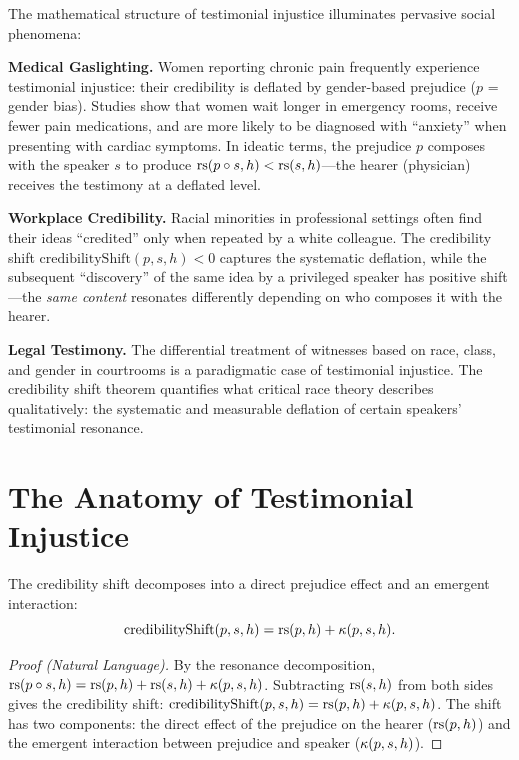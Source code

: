\begin{remark}
The mathematical structure of testimonial injustice illuminates pervasive social
phenomena:

\textbf{Medical Gaslighting.} Women reporting chronic pain frequently experience
testimonial injustice: their credibility is deflated by gender-based prejudice
($p$ = gender bias). Studies show that women wait longer in emergency rooms,
receive fewer pain medications, and are more likely to be diagnosed with
``anxiety'' when presenting with cardiac symptoms. In ideatic terms, the
prejudice $p$ composes with the speaker $s$ to produce $\mathrm{rs}(p \circ s, h) <
\mathrm{rs}(s, h)$---the hearer (physician) receives the testimony at a deflated level.

\textbf{Workplace Credibility.} Racial minorities in professional settings often
find their ideas ``credited'' only when repeated by a white colleague. The
credibility shift $\mathrm{credibilityShift}(p, s, h) < 0$ captures the
systematic deflation, while the subsequent ``discovery'' of the same idea by
a privileged speaker has positive shift---the \emph{same content} resonates
differently depending on who composes it with the hearer.

\textbf{Legal Testimony.} The differential treatment of witnesses based on race,
class, and gender in courtrooms is a paradigmatic case of testimonial injustice.
The credibility shift theorem quantifies what critical race theory describes
qualitatively: the systematic and measurable deflation of certain speakers'
testimonial resonance.
\end{remark}

\section{The Anatomy of Testimonial Injustice}

\begin{theorem}
\label{thm:credibility-decomposition}
The credibility shift decomposes into a direct prejudice effect and an emergent
interaction:
\[
  \mathrm{credibilityShift}(p, s, h) = \mathrm{rs}(p, h) + \kappa(p, s, h).
\]
\end{theorem}

\begin{proof}[Proof (Natural Language)]
By the resonance decomposition, $\mathrm{rs}(p \circ s, h) = \mathrm{rs}(p, h) + \mathrm{rs}(s, h)
+ \kappa(p, s, h)$. Subtracting $\mathrm{rs}(s, h)$ from both sides gives the
credibility shift: $\mathrm{credibilityShift}(p, s, h) = \mathrm{rs}(p, h) + \kappa(p, s, h)$.
The shift has two components: the direct effect of the prejudice on the hearer
($\mathrm{rs}(p, h)$) and the emergent interaction between prejudice and speaker
($\kappa(p, s, h)$).
\end{proof}

